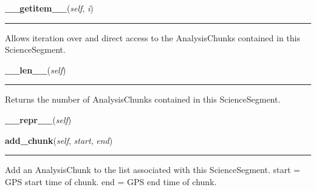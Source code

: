     \noindent\begin{boxedminipage}{\textwidth}

    \raggedright \textbf{\_\_getitem\_\_}(\textit{self}, \textit{i})

    \vspace{-1.5ex}

    \rule{\textwidth}{0.5\fboxrule}
    Allows iteration over and direct access to the AnalysisChunks 
    contained in this ScienceSegment.

    \vspace{1ex}

    \end{boxedminipage}

    \label{pipeline:ScienceSegment:__len__}
    \vspace{0.5ex}

    \noindent\begin{boxedminipage}{\textwidth}

    \raggedright \textbf{\_\_len\_\_}(\textit{self})

    \vspace{-1.5ex}

    \rule{\textwidth}{0.5\fboxrule}
    Returns the number of AnalysisChunks contained in this 
    ScienceSegment.

    \vspace{1ex}

    \end{boxedminipage}

    \label{pipeline:ScienceSegment:__repr__}
    \vspace{0.5ex}

    \noindent\begin{boxedminipage}{\textwidth}

    \raggedright \textbf{\_\_repr\_\_}(\textit{self})

    \end{boxedminipage}

    \label{pipeline:ScienceSegment:add_chunk}
    \vspace{0.5ex}

    \noindent\begin{boxedminipage}{\textwidth}

    \raggedright \textbf{add\_chunk}(\textit{self}, \textit{start}, \textit{end})

    \vspace{-1.5ex}

    \rule{\textwidth}{0.5\fboxrule}
    Add an AnalysisChunk to the list associated with this ScienceSegment. 
    start = GPS start time of chunk. end = GPS end time of chunk.

    \vspace{1ex}

    \end{boxedminipage}

